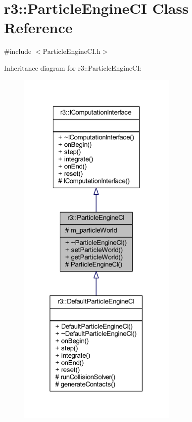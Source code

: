 \hypertarget{classr3_1_1_particle_engine_c_i}{}\section{r3\+:\+:Particle\+Engine\+CI Class Reference}
\label{classr3_1_1_particle_engine_c_i}


{\ttfamily \#include $<$Particle\+Engine\+C\+I.\+h$>$}



Inheritance diagram for r3\+:\+:Particle\+Engine\+CI\+:\nopagebreak
\begin{figure}[H]
\begin{center}
\leavevmode
\includegraphics[width=220pt]{classr3_1_1_particle_engine_c_i__inherit__graph}
\end{center}
\end{figure}


